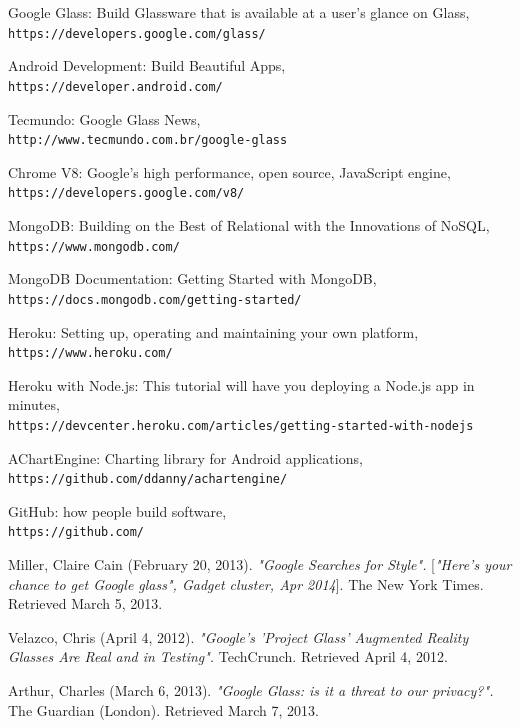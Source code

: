 \documentclass[a4paper,11pt]{article}
\begin{document}
\begin{thebibliography}{15}

Google Glass: Build Glassware that is available at a user's glance on Glass,
\\\texttt{https://developers.google.com/glass/}

Android Development: Build Beautiful Apps,
\\\texttt{https://developer.android.com/}

Tecmundo: Google Glass News,
\\\texttt{http://www.tecmundo.com.br/google-glass}

Chrome V8: Google's high performance, open source, JavaScript engine,
\\\texttt{https://developers.google.com/v8/}

MongoDB: Building on the Best of Relational with the Innovations of NoSQL,
\\\texttt{https://www.mongodb.com/}

MongoDB Documentation: Getting Started with MongoDB,
\\\texttt{https://docs.mongodb.com/getting-started/}

Heroku: Setting up, operating and maintaining your own platform,
\\\texttt{https://www.heroku.com/}

Heroku with Node.js: This tutorial will have you deploying a Node.js app in minutes,
\\\texttt{https://devcenter.heroku.com/articles/getting-started-with-nodejs}

AChartEngine: Charting library for Android applications,
\\\texttt{https://github.com/ddanny/achartengine/}

GitHub: how people build software,
\\\texttt{https://github.com/}

Miller, Claire Cain (February 20, 2013). 
\textit{"Google Searches for Style". }[\textit{"Here’s your chance to get Google glass", Gadget cluster, Apr 2014}].
The New York Times. Retrieved March 5, 2013.
 
Velazco, Chris (April 4, 2012).
\textit{"Google's 'Project Glass' Augmented Reality Glasses Are Real and in Testing".}
TechCrunch. Retrieved April 4, 2012.
 
Arthur, Charles (March 6, 2013).
\textit{"Google Glass: is it a threat to our privacy?".}
The Guardian (London). Retrieved March 7, 2013.
 
\end{thebibliography}
\end{document}
